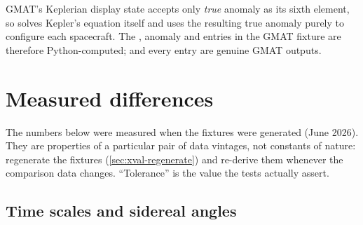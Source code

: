 \begin{lupntnote}
GMAT's Keplerian display state accepts only \emph{true} anomaly as its sixth
element, so  solves Kepler's
equation itself and uses the resulting true anomaly purely to configure each
spacecraft. The , anomaly and  entries in the GMAT
fixture are therefore Python-computed;  and every
 entry are genuine GMAT outputs.
\end{lupntnote}

\section{Measured differences}
\label{sec:xval-results}

The numbers below were measured when the fixtures were generated (June 2026).
They are properties of a particular pair of data vintages, not constants of
nature: regenerate the fixtures (\cref{sec:xval-regenerate}) and re-derive
them whenever the comparison data changes. ``Tolerance'' is the value the
tests actually assert.

\subsection{Time scales and sidereal angles}
\label{sec:xval-time}

